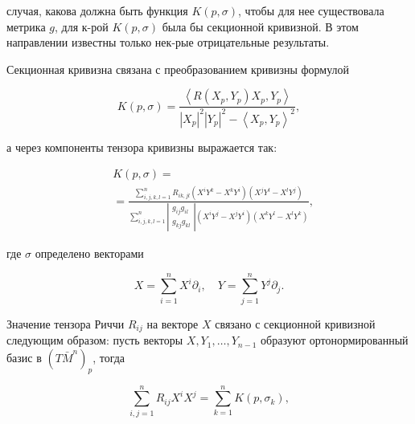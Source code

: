 \documentclass[10pt]{article}
\begin{document}
случая, какова должна быть функция $K(p, \sigma)$, чтобы для нее существовала метрика $g$, для к-рой $K(p, \sigma)$ была бы секционной кривизной. В этом направлении известны только нек-рые отрицательные результаты.



Секционная кривизна связана с преобразованием кривизны формулой



\[

K(p, \sigma)=\frac{\left\langle R\left(X_{p}, Y_{p}\right) X_{p}, Y_{p}\right\rangle}{\left|X_{p}\right|^{2}\left|Y_{p}\right|^{2}-\left\langle X_{p}, Y_{p}\right\rangle^{2}},

\]



а через компоненты тензора кривизны выражается так:



\[

\begin{aligned}

& K(p, \sigma)= \\

& =\frac{\sum_{i, j, k, l=1}^{n} R_{i k, j l}\left(X^{i} Y^{k}-X^{k} Y^{i}\right)\left(X^{j} Y^{l}-X^{l} Y^{j}\right)}{\sum_{i, j, k, l=1}^{n}\left|\begin{array}{l}

g_{i j} g_{i l} \\

g_{k j} g_{k l}

\end{array}\right|\left(X^{i} Y^{j}-X^{j} Y^{i}\right)\left(X^{k} Y^{l}-X^{l} Y^{k}\right)},

\end{aligned}

\]



где $\sigma$ определено векторами



\[

X=\sum_{i=1}^{n} X^{i} \partial_{i}, \quad Y=\sum_{j=1}^{n} Y^{j} \partial_{j} .

\]



Значение тензора Риччи $R_{i j}$ на векторе $X$ связано с секционной кривизной следующим образом: пусть векторы $X, Y_{1}, \ldots, Y_{n-1}$ образуют ортонормированный базис в $\left(T \bar{M}^{n}\right)_{p}$, тогда



\[

\sum_{i, j=1}^{n} R_{i j} X^{i} X^{j}=\sum_{k=1}^{n} K\left(p, \sigma_{k}\right),

\]
\end{document}

